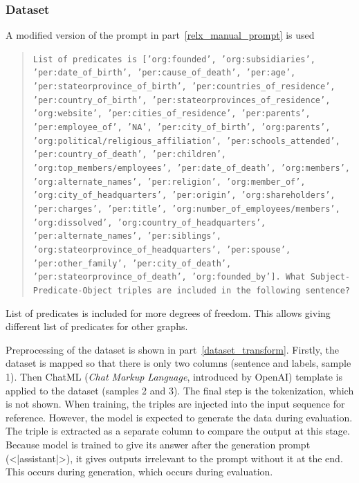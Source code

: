 \documentclass{article}
\begin{document}
\subsubsection{Dataset}
A modified version of the prompt in part~\ref{relx_manual_prompt} is used
\begin{quote}
    \texttt{List of predicates is ['org:founded', 'org:subsidiaries', 'per:date\_of\_birth', 'per:cause\_of\_death', 'per:age', 'per:stateorprovince\_of\_birth', 'per:countries\_of\_residence', 'per:country\_of\_birth', 'per:stateorprovinces\_of\_residence', 'org:website', 'per:cities\_of\_residence', 'per:parents', 'per:employee\_of', 'NA', 'per:city\_of\_birth', 'org:parents', 'org:political/religious\_affiliation', 'per:schools\_attended', 'per:country\_of\_death', 'per:children', 'org:top\_members/employees', 'per:date\_of\_death', 'org:members', 'org:alternate\_names', 'per:religion', 'org:member\_of', 'org:city\_of\_headquarters', 'per:origin', 'org:shareholders', 'per:charges', 'per:title', 'org:number\_of\_employees/members', 'org:dissolved', 'org:country\_of\_headquarters', 'per:alternate\_names', 'per:siblings', 'org:stateorprovince\_of\_headquarters', 'per:spouse', 'per:other\_family', 'per:city\_of\_death', 'per:stateorprovince\_of\_death', 'org:founded\_by']. What Subject-Predicate-Object triples are included in the following sentence?}
\end{quote}
List of predicates is included for more degrees of freedom. This allows giving different list of predicates for other graphs. 

Preprocessing of the dataset is shown in part~\ref{dataset_transform}. Firstly, the dataset is mapped so that there is only two columns (sentence and labels, sample 1). Then ChatML (\textit{Chat Markup Language}, introduced by OpenAI) template is applied to the dataset (samples 2 and 3). The final step is the tokenization, which is not shown. When training, the triples are injected into the input sequence for reference. However, the model is expected to generate the data during evaluation. The triple is extracted as a separate column to compare the output at this stage. Because model is trained to give its answer after the generation prompt (<|assistant|>), it gives outputs irrelevant to the prompt without it at the end. This occurs during generation, which occurs during evaluation.
\end{document}
